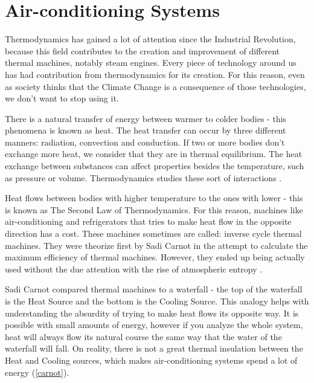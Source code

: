 \chapter[Air-conditioning Systems]{Air-conditioning Systems}

Thermodynamics has gained a lot of attention since the Industrial Revolution, because this field contributes to the creation and improvement of different thermal machines, notably steam engines. Every piece of technology around us has had contribution from thermodynamics for its creation. For this reason, even as society thinks that the Climate Change is a consequence of those technologies, we don't want to stop using it. 

There is a natural transfer of energy between warmer to colder bodies - this phenomena is known as heat. The heat transfer can occur by three different manners: radiation, convection and conduction. If two or more bodies don't exchange more heat, we consider that they are in thermal equilibrium. The heat exchange between substances can affect properties besides the temperature, such as pressure or volume. Thermodynamics studies these sort of interactions \cite{Maxwell}.

Heat flows between bodies with higher temperature to the ones with lower - this is known as The Second Law of Thermodynamics. For this reason, machines like air-conditioning and refrigerators that tries to make heat flow in the opposite direction has a cost. These machines sometimes are called: inverse cycle thermal machines. They were theorize first by Sadi Carnot in the attempt to calculate the maximum efficiency of thermal machines. However, they ended up being actually used without the due attention with the rise of atmospheric entropy \cite{Carnot}. 

Sadi Carnot compared thermal machines to a waterfall - the top of the waterfall is the Heat Source and the bottom is the Cooling Source. This analogy helps with understanding the absurdity of trying to make heat flows its opposite way. It is possible with small amounts of energy, however if you analyze the whole system, heat will always flow its natural course the same way that the water of the waterfall will fall. On reality, there is not a great thermal insulation between the Heat and Cooling sources, which makes air-conditioning systems spend a lot of energy (\autoref{carnot}).

